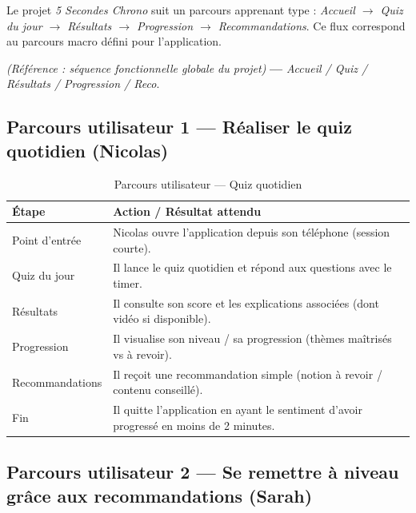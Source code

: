 Le projet \emph{5 Secondes Chrono} suit un parcours apprenant type :
\emph{Accueil $\rightarrow$ Quiz du jour $\rightarrow$ Résultats $\rightarrow$ Progression $\rightarrow$ Recommandations}.
Ce flux correspond au parcours macro défini pour l’application. \par
\noindent\textit{(Référence : séquence fonctionnelle globale du projet)} \textbf{---} \emph{Accueil / Quiz / Résultats / Progression / Reco}. \hfill

\subsection{Parcours utilisateur 1 — Réaliser le quiz quotidien (Nicolas)}

\begin{table}[h!]
\centering
\renewcommand{\arraystretch}{1.15}
\small
\begin{tabular}{|p{3.2cm}|p{10.4cm}|}
\hline
\rowcolor{black!10}
\textbf{Étape} & \textbf{Action / Résultat attendu} \\ \hline
Point d’entrée & Nicolas ouvre l’application depuis son téléphone (session courte). \\ \hline
Quiz du jour & Il lance le quiz quotidien et répond aux questions avec le timer. \\ \hline
Résultats & Il consulte son score et les explications associées (dont vidéo si disponible). \\ \hline
Progression & Il visualise son niveau / sa progression (thèmes maîtrisés vs à revoir). \\ \hline
Recommandations & Il reçoit une recommandation simple (notion à revoir / contenu conseillé). \\ \hline
Fin & Il quitte l’application en ayant le sentiment d’avoir progressé en moins de 2 minutes. \\ \hline
\end{tabular}
\caption{Parcours utilisateur — Quiz quotidien}
\end{table}

\subsection{Parcours utilisateur 2 — Se remettre à niveau grâce aux recommandations (Sarah)}

